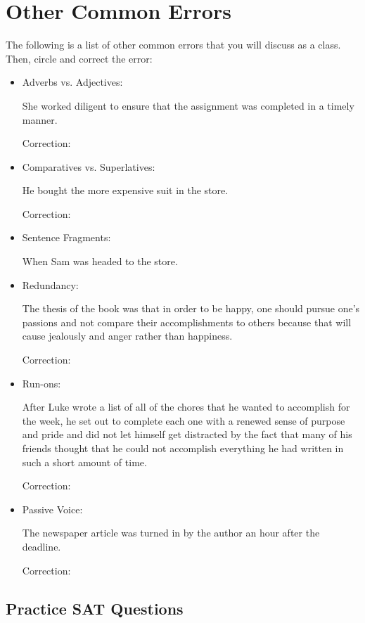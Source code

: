 \section{Other Common Errors}

The following is a list of other common errors that you will discuss as a class. Then, circle and correct the error:
\begin{itemize}
 \item{Adverbs vs. Adjectives:} \hrulefill

 She worked diligent to ensure that the assignment was completed in a timely manner. 
 
 Correction: \hrulefill
 
\item{Comparatives vs. Superlatives:} \hrulefill

He bought the more expensive suit in the store.

Correction: \hrulefill

\item{Sentence Fragments:} \hrulefill

When Sam was headed to the store.

\item{Redundancy:} \hrulefill

The thesis of the book was that in order to be happy, one should pursue one's passions and not compare their accomplishments to others because that will cause jealously and anger rather than happiness. 

Correction: \hrulefill

\item{Run-ons:} \hrulefill

After Luke wrote a list of all of the chores that he wanted to accomplish for the week, he set out to complete each one with a renewed sense of purpose and pride and did not let himself get distracted by the fact that many of his friends thought that he could not accomplish everything he had written in such a short amount of time. 

Correction: \hrulefill 

\item{Passive Voice: } \hrulefill

The newspaper article was turned in by the author an hour after the deadline. 

Correction: \hrulefill

\end{itemize} 

\subsection{Practice SAT Questions}

